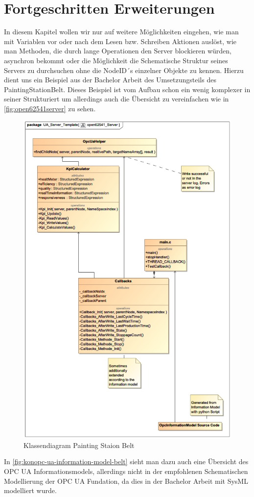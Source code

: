 \section{Fortgeschritten Erweiterungen}
In diesem Kapitel wollen wir nur auf weitere Möglichkeiten eingehen, wie man mit Variablen vor oder nach dem Lesen bzw. Schreiben Aktionen auslöst, wie man Methoden, die durch lange Operationen den Server blockieren würden, asynchron bekommt oder die Möglichkeit die Schematische Struktur seines Servers zu durchsuchen ohne die NodeID´s einzelner Objekte zu kennen. Hierzu dient uns ein Beispiel aus der Bachelor Arbeit des Umsetzungsteils des PaintingStationBelt.
Dieses Beispiel ist vom Aufbau schon ein wenig komplexer in seiner Strukturiert um allerdings auch die Übersicht zu vereinfachen wie in \autoref{fig:open62541server} zu sehen.
\begin{figure}[H]
	\centering
	\includegraphics[width=1\linewidth]{abb/open62541_Server}
	\caption{Klassendiagram Painting Staion Belt}
	\label{fig:open62541server}
\end{figure}
In \autoref{fig:konopc-ua-information-model-belt} sieht man dazu auch eine Übersicht des OPC UA Informationsmodels, allerdings nicht in der empfohlenen Schematischen Modellierung der OPC UA Fundation, da dies in der Bachelor Arbeit mit SysML modelliert wurde.

